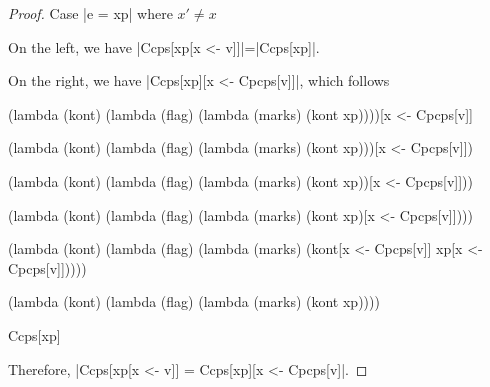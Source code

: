 \begin{proof}{Case \scheme|e = xp| where $x'\ne x$}

On the left, we have \scheme|Ccps[xp[x <- v]]|=\scheme|Ccps[xp]|.

On the right, we have \scheme|Ccps[xp][x <- Cpcps[v]]|, which follows
\begin{schemeblock}
\begin{schemedisplay}
(lambda (kont)
  (lambda (flag)
    (lambda (marks)
      (kont xp))))[x <- Cpcps[v]]
\end{schemedisplay}
\end{schemeblock}

\begin{schemeblock}
\begin{schemedisplay}
(lambda (kont)
  (lambda (flag)
    (lambda (marks)
      (kont xp)))[x <- Cpcps[v]])
\end{schemedisplay}
\end{schemeblock}

\begin{schemeblock}
\begin{schemedisplay}
(lambda (kont)
  (lambda (flag)
    (lambda (marks)
      (kont xp))[x <- Cpcps[v]]))
\end{schemedisplay}
\end{schemeblock}

\begin{schemeblock}
\begin{schemedisplay}
(lambda (kont)
  (lambda (flag)
    (lambda (marks)
      (kont xp)[x <- Cpcps[v]])))
\end{schemedisplay}
\end{schemeblock}

\begin{schemeblock}
\begin{schemedisplay}
(lambda (kont)
  (lambda (flag)
    (lambda (marks)
      (kont[x <- Cpcps[v]] xp[x <- Cpcps[v]]))))
\end{schemedisplay}
\end{schemeblock}

\begin{schemeblock}
\begin{schemedisplay}
(lambda (kont)
  (lambda (flag)
    (lambda (marks)
      (kont xp))))
\end{schemedisplay}
\end{schemeblock}

\begin{schemeblock}
\begin{schemedisplay}
Ccps[xp]
\end{schemedisplay}
\end{schemeblock}

Therefore, \scheme|Ccps[xp[x <- v]] = Ccps[xp][x <- Cpcps[v]|.
\end{proof}

